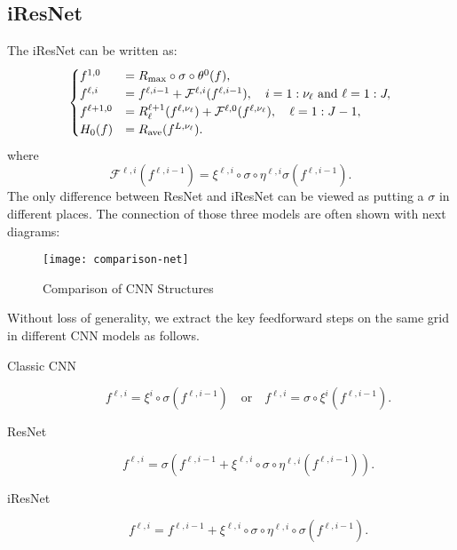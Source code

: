 \subsection{iResNet} 
	The iResNet\cite{he2016identity} can be written as:
	\begin{equation}\label{eq:iResNet1}
	\begin{cases}
	f^{1,0} &=R_{\rm max}\circ \sigma \circ \theta^0(f), \\
	f^{\ell,i} &= f^{\ell, i-1} + \mathcal{F}^{\ell, i} (f^{\ell,i-1}), \quad i = 1:\nu_\ell ~\text{and}~ \ell = 1:J ,\\
	f^{\ell+1,0} &=  R_\ell^{\ell+1} (f^{\ell, \nu_\ell} )+ \mathcal{F}^{\ell, 0} (f^{\ell, \nu_\ell} ) , \quad \ell = 1:J-1,\\
	H_0(f) &=  R_{\rm ave}(f^{L,\nu_\ell}). \\
	\end{cases}
	\end{equation}
	where
	$$
	\mathcal{F}^{\ell,i} (f^{\ell,i -1}) = \xi^{\ell,i} \circ \sigma \circ \eta^{\ell,i} \sigma (f^{\ell,i-1}).
	$$
	The only difference between ResNet and iResNet can be viewed as 
	putting a $\sigma$ in different places. 
	The connection of those three models are often shown with next diagrams:
	\begin{figure}[!htb]
		\begin{center}
			\texttt{[image: comparison-net]} 
		\end{center}
		\caption{Comparison of CNN Structures}
	\end{figure}
	

Without loss of generality, we extract the key 
feedforward steps on the same grid in different CNN models as follows.
\begin{description}
	\item[Classic CNN] 
	\begin{equation}\label{eq:cCNN}
	f^{\ell,i} = \xi^i \circ \sigma (f^{\ell,i-1}) \quad \text{or} \quad f^{\ell,i} = \sigma \circ \xi^{i} (f^{\ell,i-1}) .
	\end{equation}
	\item[ResNet] 
	\begin{equation}\label{eq:ResNet}
	f^{\ell,i} = \sigma( f^{\ell,i-1} + \xi^{\ell,i} \circ \sigma \circ \eta^{\ell,i}(f^{\ell,i-1})).
	\end{equation}
	\item[iResNet]
	\begin{equation}\label{eq:iResNet}
	f^{\ell,i} = f^{\ell,i-1} + \xi^{\ell,i} \circ \sigma \circ \eta^{\ell,i}\circ \sigma(f^{\ell,i-1}).
	\end{equation}
\end{description} 


